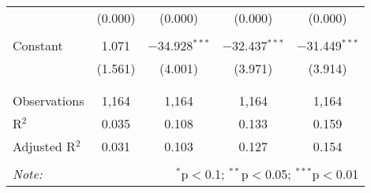 \begin{table}[!htbp]
\begin{tabular}{@{\extracolsep{-5pt}}lcccc}
  & (0.000) & (0.000) & (0.000) & (0.000) \\ 
  & & & & \\ 
 Constant & 1.071 & $-$34.928$^{***}$ & $-$32.437$^{***}$ & $-$31.449$^{***}$ \\ 
  & (1.561) & (4.001) & (3.971) & (3.914) \\ 
  & & & & \\ 
\hline \\[-1.8ex] 
Observations & 1,164 & 1,164 & 1,164 & 1,164 \\ 
R$^{2}$ & 0.035 & 0.108 & 0.133 & 0.159 \\ 
Adjusted R$^{2}$ & 0.031 & 0.103 & 0.127 & 0.154 \\ 
\hline 
\hline \\[-1.8ex] 
\textit{Note:}  & \multicolumn{4}{r}{$^{*}$p$<$0.1; $^{**}$p$<$0.05; $^{***}$p$<$0.01} \\ 
\end{tabular} 
\end{table} 
